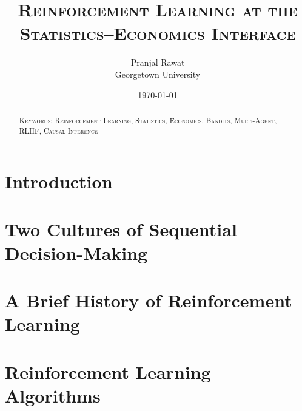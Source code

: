 %
%





\title{\textsc{Reinforcement Learning at the Statistics--Economics Interface}}
\author{Pranjal Rawat \\ Georgetown University}
\date{\today}

\maketitle

\begin{abstract}
\noindent

\bigskip

\noindent \textsc{Keywords: Reinforcement Learning, Statistics, Economics, Bandits, Multi-Agent, RLHF, Causal Inference}
\end{abstract}

\tableofcontents
\newpage

\section{Introduction}\label{section:intro}


\section{Two Cultures of Sequential Decision-Making}\label{section:language}


\section{A Brief History of Reinforcement Learning}\label{section:history}


\section{Reinforcement Learning Algorithms}\label{section:rl_algorithms}


